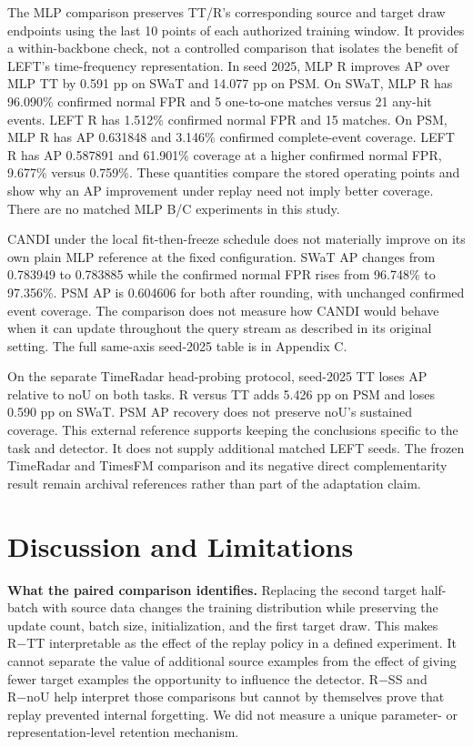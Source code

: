 \documentclass[
  american,
]{article}
\begin{document}
The MLP comparison preserves TT/R's corresponding source and target draw
endpoints using the last 10 points of each authorized training window.
It provides a within-backbone check, not a controlled comparison that
isolates the benefit of LEFT's time-frequency representation. In seed
2025, MLP R improves AP over MLP TT by 0.591 pp on SWaT and 14.077 pp on
PSM. On SWaT, MLP R has 96.090\% confirmed normal FPR and 5 one-to-one
matches versus 21 any-hit events. LEFT R has 1.512\% confirmed normal
FPR and 15 matches. On PSM, MLP R has AP 0.631848 and 3.146\% confirmed
complete-event coverage. LEFT R has AP 0.587891 and 61.901\% coverage at
a higher confirmed normal FPR, 9.677\% versus 0.759\%. These quantities
compare the stored operating points and show why an AP improvement under
replay need not imply better coverage. There are no matched MLP B/C
experiments in this study.

CANDI under the local fit-then-freeze schedule does not materially
improve on its own plain MLP reference at the fixed configuration. SWaT
AP changes from 0.783949 to 0.783885 while the confirmed normal FPR
rises from 96.748\% to 97.356\%. PSM AP is 0.604606 for both after
rounding, with unchanged confirmed event coverage. The comparison does
not measure how CANDI would behave when it can update throughout the
query stream as described in its original setting. The full same-axis
seed-2025 table is in Appendix C.

On the separate TimeRadar head-probing protocol, seed-2025 TT loses AP
relative to noU on both tasks. R versus TT adds 5.426 pp on PSM and
loses 0.590 pp on SWaT. PSM AP recovery does not preserve noU's
sustained coverage. This external reference supports keeping the
conclusions specific to the task and detector. It does not supply
additional matched LEFT seeds. The frozen TimeRadar and TimesFM
comparison and its negative direct complementarity result remain
archival references rather than part of the adaptation claim.

\section{Discussion and Limitations}\label{discussion-and-limitations}

\textbf{What the paired comparison identifies.} Replacing the second
target half-batch with source data changes the training distribution
while preserving the update count, batch size, initialization, and the
first target draw. This makes R−TT interpretable as the effect of the
replay policy in a defined experiment. It cannot separate the value of
additional source examples from the effect of giving fewer target
examples the opportunity to influence the detector. R−SS and R−noU help
interpret those comparisons but cannot by themselves prove that replay
prevented internal forgetting. We did not measure a unique parameter- or
representation-level retention mechanism.
\end{document}
